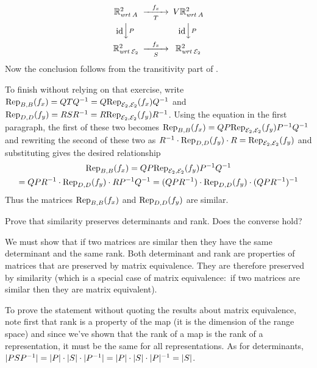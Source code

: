 \begin{exercises}
\begin{answer}
        \begin{equation*}
          \begin{CD}
            \Re^2_{\wrt{A}}                   
               @>f_x>T>        
               V\Re^2_{\wrt{A}}       \\
            @V\scriptstyle\identity VPV                
               @V\scriptstyle\identity VPV \\
            \Re^2_{\wrt{\stdbasis_2}}         
               @>f_x>S>        
               \Re^2_{\wrt{\stdbasis_2}}
          \end{CD}
        \end{equation*}
        Now the conclusion follows from the transitivity part of
        .
        
        To finish without relying on that exercise, write
        $\rep{f_x}{B,B}=QTQ^{-1}=Q\rep{f_x}{\stdbasis_2,\stdbasis_2}Q^{-1}$
        and
        $\rep{f_y}{D,D}=RSR^{-1}=R\rep{f_y}{\stdbasis_2,\stdbasis_2}R^{-1}$.
        Using the equation in the first paragraph, 
        the first of these two becomes
        $\rep{f_x}{B,B}=QP\rep{f_y}{\stdbasis_2,\stdbasis_2}P^{-1}Q^{-1}$
        and  
        rewriting the second of these two as
        $R^{-1}\cdot\rep{f_y}{D,D}\cdot R=\rep{f_y}{\stdbasis_2,\stdbasis_2}$
        and substituting gives the desired relationship
        \begin{multline*}
          \rep{f_x}{B,B}
          =QP\rep{f_y}{\stdbasis_2,\stdbasis_2}P^{-1}Q^{-1}  \\
          =QPR^{-1}\cdot\rep{f_y}{D,D}\cdot RP^{-1}Q^{-1}
          =(QPR^{-1})\cdot\rep{f_y}{D,D}\cdot (QPR^{-1})^{-1}
        \end{multline*}
        Thus the matrices \( \rep{f_x}{B,B}  \) and \( \rep{f_y}{D,D} \) are
        similar. 
      \end{answer}
  \item 
     Prove that similarity preserves determinants and rank.
     Does the converse hold?
     \begin{answer}
       We must show that if two matrices are similar then they have the same
       determinant and the same rank.
       Both determinant and rank are properties of matrices that 
       are preserved by matrix equivalence. 
       They are therefore preserved by similarity (which is a 
       special case of matrix equivalence:~if two matrices
       are similar then they are matrix equivalent).

       To prove the statement without quoting the results about
       matrix equivalence, note first that
       rank is a property of the map (it is the dimension of the range space)
       and since we've shown that 
       the rank of a map is the rank of a representation,
       it must be the same for all representations.
       As for determinants,
       \( \deter{PSP^{-1}}=\deter{P}\cdot\deter{S}\cdot\deter{P^{-1}}
          =\deter{P}\cdot\deter{S}\cdot\deter{P}^{-1}=\deter{S} \).


\end{answer}
\end{exercises}
